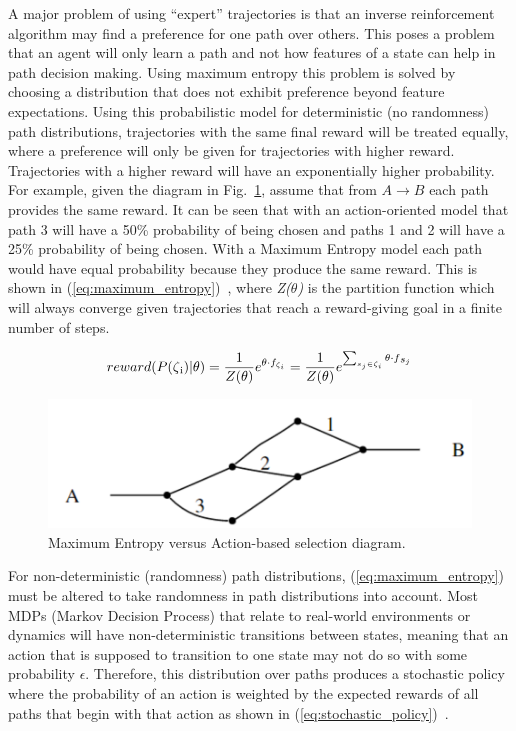 \documentclass[12pt,american]{report}
\begin{document}
A major problem of using ``expert'' trajectories is that an inverse reinforcement algorithm may find a preference for one path over others.  This poses a problem that an agent will only learn a path and not how features of a state can help in path decision making.  Using maximum entropy this problem is solved by choosing a distribution that does not exhibit preference beyond feature expectations.  Using this probabilistic model for deterministic (no randomness) path distributions, trajectories with the same final reward will be treated equally, where a preference will only be given for trajectories with higher reward.  Trajectories with a higher reward will have an exponentially higher probability. For example, given the diagram in Fig.~\ref{fig:maxent-example}, assume that from $A \rightarrow B$ each path provides the same reward.  It can be seen that with an action-oriented model that path 3 will have a 50\% probability of being chosen and paths 1 and 2 will have a 25\% probability of being chosen.  With a Maximum Entropy model each path would have equal probability because they produce the same reward. This is shown in (\ref{eq:maximum_entropy})~\cite{ziebart2008maximum}, where \textit{Z($\theta$)} is the partition function which will always converge given trajectories that reach a reward-giving goal in a finite number of steps. 

\begin{equation}
            \label{eq:maximum_entropy}
            reward(P(\zeta\textsubscript{i})|\theta)= \frac{1}{Z(\theta)} e^{\theta \cdot f_{\zeta_i}}=  \frac{1}{Z(\theta)} e^{\sum_{s_j\in\zeta_i}^{}\theta \cdot f\textsubscript{$s_j$}}%
        \end{equation}

\begin{figure}
\centering
\includegraphics[scale=.75]{images/maxent-example.png}
\caption{Maximum Entropy versus Action-based selection diagram.~\cite{ziebart2008maximum}}
\label{fig:maxent-example}
\end{figure}

For non-deterministic (randomness) path distributions, (\ref{eq:maximum_entropy}) must be altered to take randomness in path distributions into account. Most MDPs (Markov Decision Process) that relate to real-world environments or dynamics will have non-deterministic transitions between states, meaning that an action that is supposed to transition to one state may not do so with some probability $\epsilon$.  Therefore, this distribution over paths produces a stochastic policy where the probability of an action is weighted by the expected rewards of all paths that begin with that action as shown in (\ref{eq:stochastic_policy})~\cite{ziebart2008maximum}.
\end{document}
